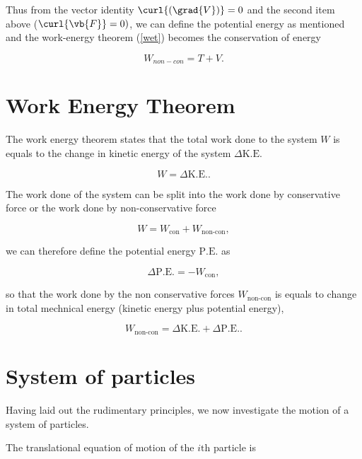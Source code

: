 \documentclass[a4paper,12pt]{report}
\begin{document}
Thus from the vector identity \(\curl{(\grad{V}) } = 0\) and the second item above (\(\curl{\vb{F} } =0)\), we can define the potential energy as mentioned and the work-energy theorem (\cref{wet}) becomes the conservation of energy

\begin{equation}
	W_{non-con} = T + V. \label{con} 
\end{equation}

\section{Work Energy Theorem}

The work energy theorem states that the total work done to the system \(W\) is equals to the change in kinetic energy of the system \(\Delta \text{K.E.}\) 

\begin{equation}
	W = \Delta \text{K.E.} .
\end{equation}

The work done of the system can be split into the work done by conservative force or the work done by non-conservative force

\begin{equation}
	W = W_{\text{con} } + W_{\text{non-con} },  
\end{equation}

we can therefore define the potential energy \(\text{P.E.} \) as 

\begin{equation}
	\Delta \text{P.E.}  = - W_{\text{con} }, 
\end{equation}

so that the work done by the non conservative forces \(W_{\text{non-con} } \) is equals to change in total mechnical energy (kinetic energy plus potential energy), 

\begin{equation}
	W_{\text{non-con} } = \Delta \text{K.E.}  + \Delta \text{P.E.}.  
\end{equation}


\section{System of particles}
Having laid out the rudimentary principles, we now investigate the motion of a system of particles.

The translational equation of motion of the \(i \text{th} \) particle is 
\end{document}
